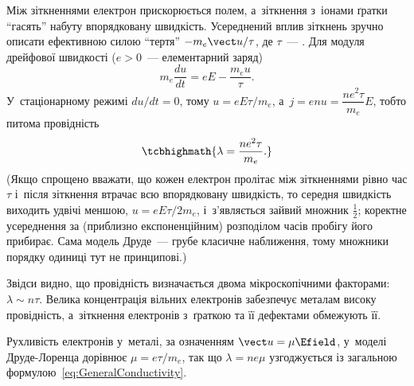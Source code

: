 Між зіткненнями електрон прискорюється полем, а~зіткнення з~іонами ґратки \enquote{гасять}
набуту впорядковану швидкість. Усереднений вплив зіткнень зручно описати ефективною силою
\enquote{тертя} $-m_e\vect u/\tau$, де $\tau$~--- .
Для модуля дрейфової швидкості ($e>0$~--- елементарний заряд)
\begin{equation*}
	m_e\frac{du}{dt}=eE-\frac{m_eu}{\tau}.
\end{equation*}
У~стаціонарному режимі $du/dt=0$, тому $u=eE\tau/m_e$, а~$j=enu=\dfrac{ne^2\tau}{m_e}E$,
тобто питома провідність
\begin{equation}\label{eq:DrudeLorentzConductivity}
	\tcbhighmath{
		\lambda = \frac{ne^2\tau}{m_e}.
	}
\end{equation}
(Якщо спрощено вважати, що кожен електрон пролітає між зіткненнями рівно час $\tau$
і~після зіткнення втрачає всю впорядковану швидкість, то середня швидкість виходить удвічі
меншою, $u=eE\tau/2m_e$, і~з'являється зайвий множник $\tfrac12$; коректне усереднення за
(приблизно експоненційним) розподілом часів пробігу його прибирає. Сама модель Друде~---
грубе класичне наближення, тому множники порядку одиниці тут не принципові.)

Звідси видно, що провідність визначається двома мікроскопічними факторами: $\lambda\sim
n\tau$. Велика концентрація вільних електронів забезпечує металам високу провідність,
а~зіткнення електронів з~ґраткою та її дефектами обмежують її.

Рухливість електронів у~металі, за означенням $\vect u=\mu\Efield$, у~моделі Друде-Лоренца
дорівнює $\mu=e\tau/m_e$, так що $\lambda=ne\mu$ узгоджується із загальною
формулою~\eqref{eq:GeneralConductivity}.

